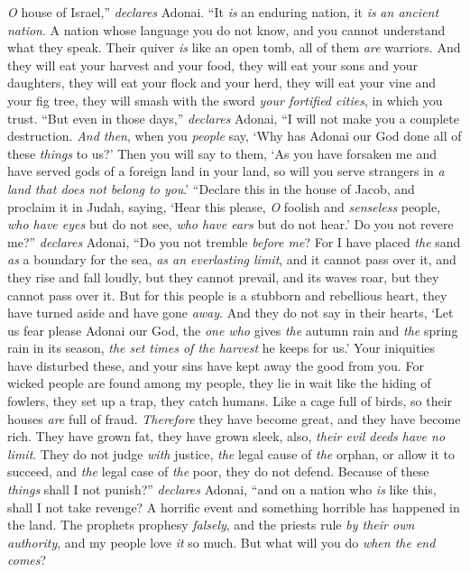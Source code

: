\begin{biblechapter}
\textit{O} house of Israel,” \textit{declares} Adonai. 
“It \textit{is} an enduring nation, it \textit{is} \textit{an ancient nation}. 
A nation whose language you do not know, 
and you cannot understand what they speak.
\verse Their quiver \textit{is} like an open tomb, 
all of them \textit{are} warriors.
\verse And they will eat your harvest and your food, 
they will eat your sons and your daughters, 
they will eat your flock and your herd, 
they will eat your vine and your fig tree, 
they will smash with the sword \textit{your fortified cities}, 
in which you trust.
\verse “But even in those days,” \textit{declares} Adonai, “I will not make you a complete destruction.
\verse \textit{And then}, when you \textit{people} say, ‘Why has Adonai our God done all of these \textit{things} to us?’ Then you will say to them, ‘As you have forsaken me and have served gods of a foreign land in your land, so will you serve strangers in \textit{a land that does not belong to you}.’
\verse “Declare this in the house of Jacob, 
and proclaim it in Judah, saying,
\verse ‘Hear this please, \textit{O} foolish and \textit{senseless} people, 
\textit{who have eyes} but do not see, 
\textit{who have ears} but do not hear.’
\verse Do you not revere me?” \textit{declares} Adonai, 
“Do you not tremble \textit{before me}? 
For I have placed \textit{the} sand \textit{as} a boundary for the sea, 
\textit{as an everlasting limit}, and it cannot pass over it, 
and they rise and fall loudly, but they cannot prevail, 
and its waves roar, but they cannot pass over it.
\verse But for this people is a stubborn and rebellious heart, 
they have turned aside and have gone \textit{away}.
\verse And they do not say in their hearts, 
‘Let us fear please Adonai our God, 
the \textit{one who} gives \textit{the} autumn rain and \textit{the} spring rain in its season, 
\textit{the set times of the harvest} he keeps for us.’
\verse Your iniquities have disturbed these, 
and your sins have kept away the good from you.
\verse For wicked people are found among my people, 
they lie in wait like the hiding of fowlers, 
they set up a trap, 
they catch humans.
\verse Like a cage full of birds, 
so their houses \textit{are} full of fraud. 
\textit{Therefore} they have become great, 
and they have become rich.
\verse They have grown fat, 
they have grown sleek, 
also, \textit{their evil deeds have no limit}. 
They do not judge \textit{with} justice, 
\textit{the} legal cause of \textit{the} orphan, 
or allow it to succeed, 
and \textit{the} legal case of \textit{the} poor, 
they do not defend.
\verse Because of these \textit{things} shall I not punish?” \textit{declares} Adonai, 
“and on a nation who \textit{is} like this, shall I not take revenge?
\verse A horrific event and something horrible has happened in the land.
\verse The prophets prophesy \textit{falsely}, 
and the priests rule \textit{by their own authority}, 
and my people love \textit{it} so much. 
But what will you do \textit{when the end comes}?
\end{biblechapter}

